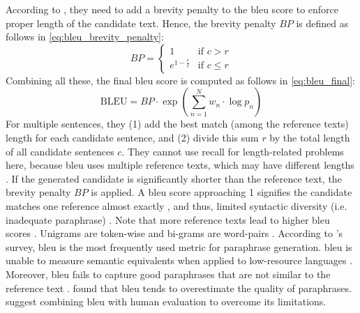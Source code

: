 According to \citet{papineni_bleu_2001}, they need to add a brevity penalty to the \ac{bleu} score 
to enforce proper length of the candidate text. 
Hence, the brevity penalty $BP$ is defined as follows in \autoref{eq:bleu_brevity_penalty}:
\begin{equation}
    BP = \begin{cases}
        1 & \text{if } c > r \\
        e^{1 - \frac{r}{c}} & \text{if } c \leq r
    \end{cases}
\label{eq:bleu_brevity_penalty}
\end{equation}
Combining all these, the final \ac{bleu} score is computed as follows in \autoref{eq:bleu_final}:
\begin{equation}
    \text{BLEU} = BP \cdot \exp\left(\sum_{n=1}^{N} w_n \cdot \log p_n\right)
\label{eq:bleu_final}
\end{equation}
For multiple sentences, they (1) add the best match (among the reference texts) length for each candidate sentence, 
and (2) divide this sum $r$ by the total length of all candidate sentences $c$. 
They cannot use recall for length-related problems here, 
because \ac{bleu} uses multiple reference texts, which may have different lengths \citep{papineni_bleu_2001,banerjee_METEOR_2005}.
If the generated candidate is significantly shorter than the reference text, the brevity penalty $BP$ is applied.
A \ac{bleu} score approaching 1 signifies the candidate matches one reference almost exactly \citep{papineni_bleu_2001}, 
and thus, limited syntactic diversity (i.e. inadequate paraphrase) \citep{kurt_pehlivanoglu_comparative_2024}.
Note that more reference texts lead to higher \ac{bleu} scores \citep{papineni_bleu_2001}.
Unigrams are token-wise and bi-grams are word-pairs \citet{palivela_optimization_2021}.
According to \citet{zhou_paraphrase_2021}'s survey, \ac{bleu} is the most frequently used metric for paraphrase generation.
\ac{bleu} is unable to measure semantic equivalents \citep{kurt_pehlivanoglu_comparative_2024,zhou_paraphrase_2021} 
when applied to low-resource languages \citep{zhou_paraphrase_2021}.
Moreover, \ac{bleu} fails to capture good paraphrases that are not similar to the reference text \citep{zhou_paraphrase_2021}.
\citet{kurt_pehlivanoglu_comparative_2024} found that \ac{bleu} tends to overestimate the quality of paraphrases.
\citet{zhou_paraphrase_2021} suggest combining \ac{bleu} with human evaluation to overcome its limitations.


